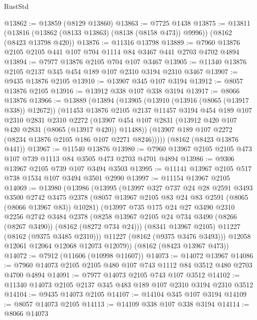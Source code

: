 \begin{lexlean}{RustStd}
\begin{coremodule}
@13862 := @13859 (@8129 @13860)
@13863 := @7725 @1438
@13875 := @13811
    (@13816 (@13862 (@8133 @13863) (@8138 (@8158 @473)) @9996))
    (@8162 (@8423 @13798 @420))
@13876 := @11316 @13798
@13889 := @7960 @13876 @2105 @2105 @441 @107 @704 @1114 @84 @3467 @441 @2703 @4702 @4894
@13894 := @7977 @13876 @2105 @704 @107 @3467
@13905 := @11340 @13876 @2105 @2137 @345 @454 @189 @107 @2310 @3194 @2310 @3467
@13907 := @9435 @13876 @2105
@13910 := @13907 @345 @107 @3194
@13912 := @8057 @13876 @2105
@13916 := @13912 @338 @107 @338 @3194
@13917 := @8066 @13876
@13966 := @13889
    (@13894
      (@13905
        (@13910 (@13916 (@8065 (@13917 @338)) @12672))
        (@11453
          @13876
          @2105
          @2137
          @11457
          @3194
          @454
          @189
          @107
          @2310
          @2831
          @2310
          @2272
          (@13907 @454 @107 @2831 (@13912 @420 @107 @420 @2831 (@8065 (@13917 @420)) @11488))
          (@13907 @189 @107 @2272 (@8234 @13876 @2105 @186 @107 @2271 @8246)))))
    (@8162 (@8423 @13876 @441))
@13967 := @11540 @13876
@13980 := @7960 @13967 @2105 @2105 @473 @107 @739 @1113 @84 @3505 @473 @2703 @4701 @4894
@13986 := @9306 @13967 @2105 @739 @107 @3494 @3503
@13995 := @11141 @13967 @2105 @517 @738 @1534 @107 @3494 @3501 @2990
@13997 := @11154 @13967 @2105
@14069 := @13980
    (@13986
      (@13995
        (@13997
          @327
          @737
          @24
          @28
          @2591
          @3493
          @3500
          @2742
          @3475
          @2378
          (@8057 @13967 @2105 @83 @24 @83 @2591 (@8065 (@8066 @13967 @83)) @10281)
          (@13997
            @735
            @175
            @24
            @27
            @3490
            @2310
            @2256
            @2742
            @3484
            @2378
            (@8258 @13967 @2105 @24 @734 @3490 (@8266 (@8267 @3490)) (@8162 (@8272 @734 @24)))
            (@8341 @13967 @2105)
            @11227
            (@8162 (@9375 @3485 @2310)))
          @11227
          (@8162 (@9375 @3476 @3493)))
        @12058
        @12061
        @12064
        @12068
        @12073
        @12079))
    (@8162 (@8423 @13967 @473))
@14072 := @7912 (@11606 (@10998 @11607))
@14073 := @14072 @13967
@14086 := @7960 @14073 @2105 @2105 @480 @107 @743 @1112 @84 @3512 @480 @2703 @4700 @4894
@14091 := @7977 @14073 @2105 @743 @107 @3512
@14102 := @11340 @14073 @2105 @2137 @345 @483 @189 @107 @2310 @3194 @2310 @3512
@14104 := @9435 @14073 @2105
@14107 := @14104 @345 @107 @3194
@14109 := @8057 @14073 @2105
@14113 := @14109 @338 @107 @338 @3194
@14114 := @8066 @14073

\end{coremodule}
\end{lexlean}
